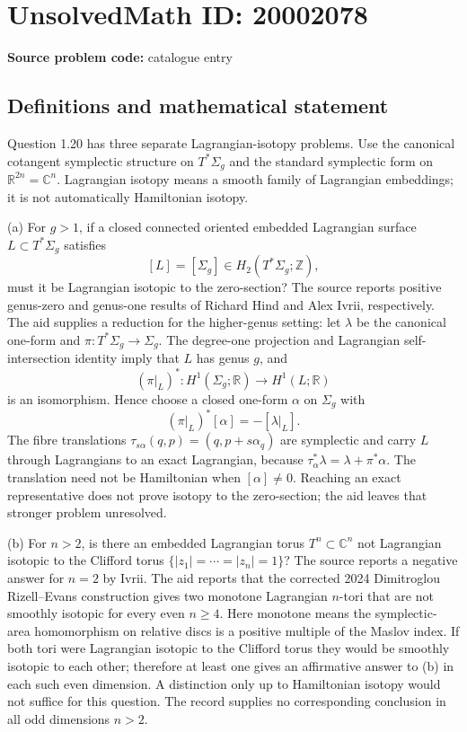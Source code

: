 \documentclass[11pt]{article}
\newcommand{\Z}{\mathbb{Z}}
\newcommand{\R}{\mathbb{R}}
\newcommand{\C}{\mathbb{C}}
\begin{document}
\section*{UnsolvedMath ID: 20002078}
\textbf{Source problem code:} catalogue entry
\subsection{Definitions and mathematical statement}
Question 1.20 has three separate Lagrangian-isotopy problems. Use the canonical cotangent symplectic structure on \(T^*\Sigma_g\) and the standard symplectic form on \(\R^{2n}=\C^n\). Lagrangian isotopy means a smooth family of Lagrangian embeddings; it is not automatically Hamiltonian isotopy.

(a) For \(g>1\), if a closed connected oriented embedded Lagrangian surface \(L\subset T^*\Sigma_g\) satisfies
\[
 [L]=[\Sigma_g]\in H_2(T^*\Sigma_g;\Z),
\]
must it be Lagrangian isotopic to the zero-section? The source reports positive genus-zero and genus-one results of Richard Hind and Alex Ivrii, respectively. The aid supplies a reduction for the higher-genus setting: let \(\lambda\) be the canonical one-form and \(\pi:T^*\Sigma_g\to\Sigma_g\). The degree-one projection and Lagrangian self-intersection identity imply that \(L\) has genus \(g\), and
\[
 (\pi|_L)^*:H^1(\Sigma_g;\R)\longrightarrow H^1(L;\R)
\]
is an isomorphism. Hence choose a closed one-form \(\alpha\) on \(\Sigma_g\) with
\[
 (\pi|_L)^*[\alpha]=-[\lambda|_L].
\]
The fibre translations \(\tau_{s\alpha}(q,p)=(q,p+s\alpha_q)\) are symplectic and carry \(L\) through Lagrangians to an exact Lagrangian, because
\(\tau_\alpha^*\lambda=\lambda+\pi^*\alpha\).
The translation need not be Hamiltonian when \([\alpha]\ne0\). Reaching an exact representative does not prove isotopy to the zero-section; the aid leaves that stronger problem unresolved.

(b) For \(n>2\), is there an embedded Lagrangian torus \(T^n\subset\C^n\) not Lagrangian isotopic to the Clifford torus \(\{|z_1|=\cdots=|z_n|=1\}\)? The source reports a negative answer for \(n=2\) by Ivrii. The aid reports that the corrected 2024 Dimitroglou Rizell--Evans construction gives two monotone Lagrangian \(n\)-tori that are not smoothly isotopic for every even \(n\geq4\). Here monotone means the symplectic-area homomorphism on relative discs is a positive multiple of the Maslov index. If both tori were Lagrangian isotopic to the Clifford torus they would be smoothly isotopic to each other; therefore at least one gives an affirmative answer to (b) in each such even dimension. A distinction only up to Hamiltonian isotopy would not suffice for this question. The record supplies no corresponding conclusion in all odd dimensions \(n>2\).
\end{document}
